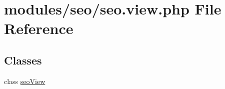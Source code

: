 \hypertarget{seo_8view_8php}{\section{modules/seo/seo.view.\-php File Reference}
\label{seo_8view_8php}
}
\subsection*{Classes}
\begin{DoxyCompactItemize}
\item 
class \hyperlink{classseoView}{seo\-View}
\end{DoxyCompactItemize}
